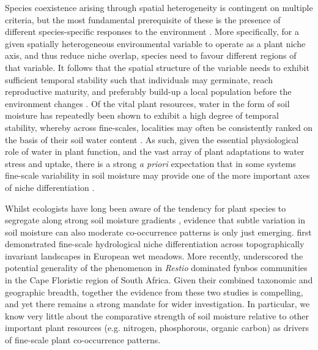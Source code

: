 Species coexistence arising through spatial heterogeneity is contingent on multiple criteria, but the most fundamental prerequisite of these is the presence of different species-specific responses to the environment \citep{Chesson2000, Silvertown2004}. More specifically, for a given spatially heterogeneous environmental variable to operate as a plant niche axis, and thus reduce niche overlap, species need to favour different regions of that variable. It follows that the spatial structure of the variable needs to exhibit sufficient temporal stability such that individuals may germinate, reach reproductive maturity, and preferably build-up a local population before the environment changes \citep{Grubb1977, Chesson2000, Muko2000, Amarasekare2003}. Of the vital plant resources, water in the form of soil moisture has repeatedly been shown to exhibit a high degree of temporal stability, whereby across fine-scales, localities may often be consistently ranked on the basis of their soil water content \citep{Vachaud1985, Cassel2000, Pachepsky2005}. As such, given the essential physiological role of water in plant function, and the vast array of plant adaptations to water stress and uptake, there is a strong \textit{a priori} expectation that in some systems fine-scale variability in soil moisture may provide one of the more important axes of niche differentiation \citep{Silvertown2015}. 

Whilst ecologists have long been aware of the tendency for plant species to segregate along strong soil moisture gradients \citep{Pickett1978}, evidence that subtle variation in soil moisture can also moderate co-occurrence patterns is only just emerging. \citet{Silvertown1999} first demonstrated fine-scale hydrological niche differentiation across topographically invariant landscapes in European wet meadows. More recently, \citet{Araya2011} underscored the potential generality of the phenomenon in \textit{Restio} dominated fynbos communities in the Cape Floristic region of South Africa. Given their combined taxonomic and geographic breadth, together the evidence from these two studies is compelling, and yet there remains a strong mandate for wider investigation. In particular, we know very little about the comparative strength of soil moisture relative to other important plant resources (e.g. nitrogen, phosphorous, organic carbon) as drivers of fine-scale plant co-occurrence patterns.


